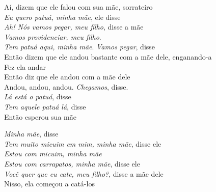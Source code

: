 \begin{linenumbers}\begingroup\raggedright
\noindent Aí, dizem que ele falou com sua mãe, sorrateiro\\
\emph{Eu quero patuá, minha mãe}, ele disse\\
\emph{Ah! Nós vamos pegar, meu filho}, disse a mãe\\
\emph{Vamos providenciar, meu filho}.\\
\emph{Tem patuá aqui, minha mãe}. \emph{Vamos pegar}, disse\\
Então dizem que ele andou bastante com a mãe dele, enganando-a\\
Fez ela andar\\
Então diz que ele andou com a mãe dele\\
Andou, andou, andou. \emph{Chegamos}, disse.\\
\emph{Lá está o patuá}, disse\\
\emph{Tem aquele patuá lá}, disse\\
Então esperou sua mãe
\end{linenumbers}\endgroup

\bigskip

\begin{linenumbers}\begingroup\raggedright
\noindent \emph{Minha mãe}, disse\\
\emph{Tem muito micuim em mim, minha mãe}, disse ele\\
\emph{Estou com micuim, minha mãe}\\
\emph{Estou com carrapatos, minha mãe}, disse ele\\
\emph{Você quer que eu cate, meu filho?}, disse a mãe dele\\
Nisso, ela começou a catá-los
\end{linenumbers}\endgroup

